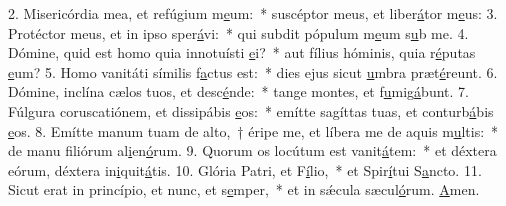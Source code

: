 2. Misericórdia mea, et refúgium m\uline{e}um:~* suscéptor meus, et liber\uline{á}tor m\uline{e}us:
3. Protéctor meus, et in ipso sper\uline{á}vi:~* qui subdit pópulum m\uline{e}um s\uline{u}b me.
4. Dómine, quid est homo quia innotuísti \uline{e}i?~* aut fílius hóminis, quia r\uline{é}putas \uline{e}um?
5. Homo vanitáti símilis f\uline{a}ctus est:~* dies ejus sicut \uline{u}mbra præt\uline{é}reunt.
6. Dómine, inclína cælos tuos, et desc\uline{é}nde:~* tange montes, et f\uline{u}mig\uline{á}bunt.
7. Fúlgura coruscatiónem, et dissipábis \uline{e}os:~* emítte sagíttas tuas, et conturb\uline{á}bis \uline{e}os.
8. Emítte manum tuam de alto,~† éripe me, et líbera me de aquis m\uline{u}ltis:~* de manu filiórum al\uline{i}en\uline{ó}rum.
9. Quorum os locútum est vanit\uline{á}tem:~* et déxtera eórum, déxtera in\uline{i}quit\uline{á}tis.
10. Glória Patri, et F\uline{í}lio,~* et Spir\uline{í}tui S\uline{a}ncto.
11. Sicut erat in princípio, et nunc, et s\uline{e}mper,~* et in sǽcula sæcul\uline{ó}rum. \uline{A}men.
